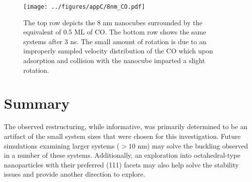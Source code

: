 \begin{landscape}
\begin{figure}[p!]
\centering
  \texttt{[image: ../figures/appC/8nm\_CO.pdf]}
  \caption{The top row depicts the 8 nm nanocubes surrounded by the equivalent
of 0.5 ML of CO. The bottom row shows the same systems after 3 ns.  The small
amount of rotation is due to an improperly sampled velocity distribution of the
CO which upon adsorption and collision with the nanocube imparted a slight
rotation.}
  \label{fig:8nmCO}
\end{figure}
\end{landscape}

\section{Summary}
The observed restructuring, while informative, was primarily determined to be an
artifact of the small system sizes that were chosen for this investigation.
Future simulations examining larger systems ($>10$ nm) may solve the buckling
observed in a number of these systems. Additionally, an exploration into
octahedral-type nanoparticles with their preferred (111) facets may also help
solve the stability issues and provide another direction to explore.

